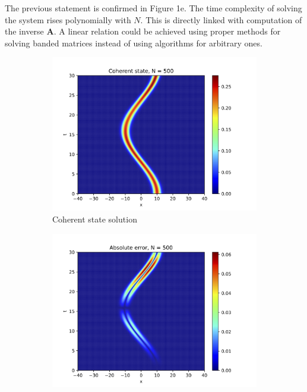 \documentclass[12pt, a4paper]{article}
\begin{document}
The previous statement is confirmed in Figure 1e. The time complexity of solving the system rises polynomially with $N$. This is directly linked with computation of the inverse $\boldsymbol{A}$. A linear relation could be achieved using proper methods for solving banded matrices instead of using algorithms for arbitrary ones.

\begin{figure}[hbtp]
  \begin{subfigure}{0.5\textwidth}
  \includegraphics[width=\linewidth]{coherent copy.png}
  \caption{Coherent state solution} \label{fig:a}
  \end{subfigure}
  \hspace*{\fill}
  \begin{subfigure}{0.5\textwidth}
  \includegraphics[width=\linewidth]{coherent_error copy.png}

\end{subfigure}
\end{figure}
\end{document}
